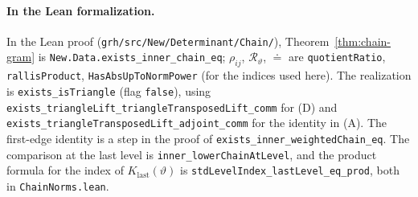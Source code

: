 \documentclass[reqno]{amsart}
\theoremstyle{definition}
\theoremstyle{plain}
\newcommand{\Rc}{\mathcal R}
\newcommand{\Klast}{K_{\mathrm{last}}}
\newcommand{\tl}[1]{\texttt{#1}}
\begin{document}
\paragraph{In the Lean formalization.}
\begin{sloppypar}
In the Lean proof \cite{GL} (\tl{grh/\allowbreak src/\allowbreak New/\allowbreak Determinant/\allowbreak Chain/}), Theorem~\ref{thm:chain-gram} is \tl{New.\allowbreak Data.\allowbreak exists\_\allowbreak inner\_\allowbreak chain\_\allowbreak eq}; \(\rho_{ij}\), \(\Rc_\vartheta\), \(\doteq\) are \tl{quotientRatio}, \tl{rallisProduct}, \tl{HasAbsUpToNormPower} (for the indices used here).  The realization is \tl{exists\_\allowbreak isTriangle} (flag \tl{false}), using \tl{exists\_\allowbreak triangleLift\_\allowbreak triangleTransposedLift\_\allowbreak comm} for (D) and \tl{exists\_\allowbreak triangleTransposedLift\_\allowbreak adjoint\_\allowbreak comm} for the identity in (A).  The first-edge identity is a step in the proof of \tl{exists\_\allowbreak inner\_\allowbreak weightedChain\_\allowbreak eq}.  The comparison at the last level is \tl{inner\_\allowbreak lowerChainAtLevel}, and the product formula for the index of \(\Klast(\vartheta)\) is \tl{stdLevelIndex\_\allowbreak lastLevel\_\allowbreak eq\_\allowbreak prod}, both in \tl{ChainNorms.lean}.
\end{sloppypar}
\end{document}
